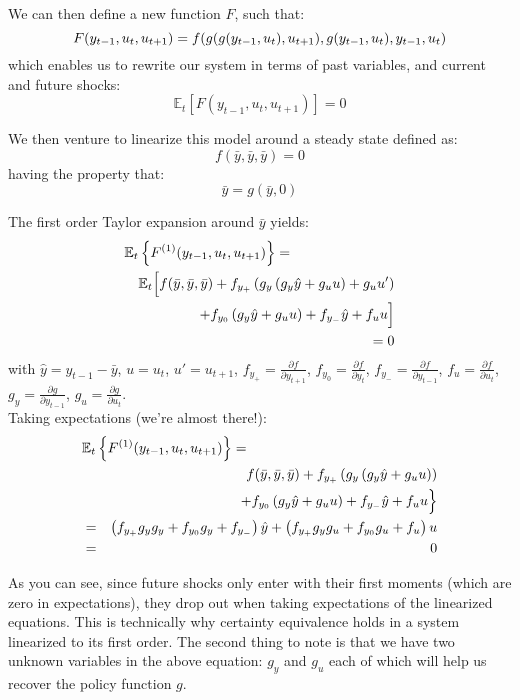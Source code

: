 We can then define a new function $F$, such that:
\[
F(y_{t-1},u_t,u_{t+1}) =
f(g(g(y_{t-1},u_t),u_{t+1}),g(y_{t-1},u_t),y_{t-1},u_t)\\
\]
which enables us to rewrite our system in terms of past variables, and current and future shocks:
\[
\mathbb{E}_t\left[F(y_{t-1},u_t,u_{t+1})\right] = 0
\]

We then venture to linearize this model around a steady state defined as:
\[
f(\bar y, \bar y, \bar y) = 0
\]
having the property that:
\[
\bar y = g(\bar y, 0)
\]

The first order Taylor expansion around $\bar y$ yields:
\begin{eqnarray*}
\lefteqn{\mathbb{E}_t\left\{F^{(1)}(y_{t-1},u_t,u_{t+1})\right\} =}\\
&& \mathbb{E}_t\Big[f(\bar y, \bar y, \bar y)+f_{y_+}\left(g_y\left(g_y\hat y+g_uu \right)+g_u u' \right)\\
&& + f_{y_0}\left(g_y\hat y+g_uu \right)+f_{y_-}\hat y+f_u u\Big]\\
&& = 0
\end{eqnarray*}
with $\hat y = y_{t-1} - \bar y$, $u=u_t$, $u'=u_{t+1}$, $f_{y_+}=\frac{\partial f}{\partial y_{t+1}}$, $f_{y_0}=\frac{\partial f}{\partial y_t}$, $f_{y_-}=\frac{\partial f}{\partial y_{t-1}}$, $f_{u}=\frac{\partial f}{\partial u_t}$, $g_y=\frac{\partial g}{\partial y_{t-1}}$, $g_u=\frac{\partial g}{\partial u_t}$.\\

Taking expectations (we're almost there!):
\begin{eqnarray*}
   \lefteqn{\mathbb{E}_t\left\{F^{(1)}(y_{t-1},u_t, u_{t+1})\right\} =}\\
&& f(\bar y, \bar y, \bar y)+f_{y_+}\left(g_y\left(g_y\hat y+g_uu \right) \right)\\
&& + f_{y_0}\left(g_y\hat y+g_uu \right)+f_{y_-}\hat y+f_u u\Big\}\\
&=& \left(f_{y_+}g_yg_y+f_{y_0}g_y+f_{y_-}\right)\hat y+\left(f_{y_+}g_yg_u+f_{y_0}g_u+f_{u}\right)u\\
&=& 0\\
\end{eqnarray*}

As you can see, since future shocks only enter with their first moments (which are zero in expectations), they drop out when taking expectations of the linearized equations. This is technically why certainty equivalence holds in a system linearized to its first order. The second thing to note is that we have two unknown variables in the above equation: $g_y$ and $g_u$ each of which will help us recover the policy function $g$. \\

